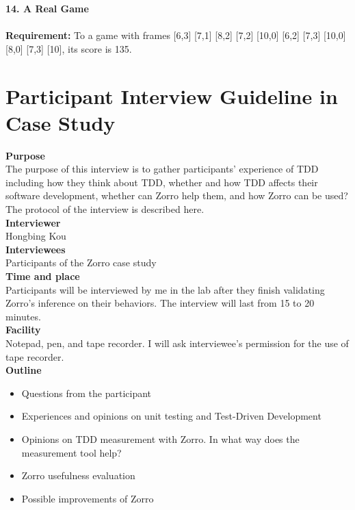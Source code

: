 \noindent \textbf{14. A Real Game} \\
\textit{} \\
\textbf{Requirement:} To a game with frames [6,3] [7,1] [8,2] [7,2] [10,0] [6,2] [7,3] [10,0] [8,0] [7,3] [10], its score is 135.  

\chapter{Participant Interview Guideline in Case Study}
\label{app:CaseStudyInterviewGuide}

\noindent \textbf{Purpose} \\
The purpose of this interview is to gather participants' experience of
TDD including how they think about TDD, whether and how TDD affects
their software development, whether can Zorro help them, and how Zorro
can be used? The protocol of the interview is described here.\\

\noindent \textbf{Interviewer} \\
Hongbing Kou \\

\noindent \textbf{Interviewees} \\
Participants of the Zorro case study \\

\noindent \textbf{Time and place}\\ 
Participants will be interviewed by me in the lab after they finish
validating Zorro's inference on their behaviors. The interview will
last from 15 to 20 minutes.  \\

\noindent \textbf{Facility}\\ 
Notepad, pen, and tape recorder. I will ask interviewee's permission for
the use of tape recorder. \\

\noindent \textbf{Outline}
\begin{itemize}
  \item {Questions from the participant}
  \item {Experiences and opinions on unit testing and Test-Driven Development}
  \item {Opinions on TDD measurement with Zorro. In what way does the measurement tool help?}
  \item {Zorro usefulness evaluation}
  \item {Possible improvements of Zorro}
\end{itemize}

